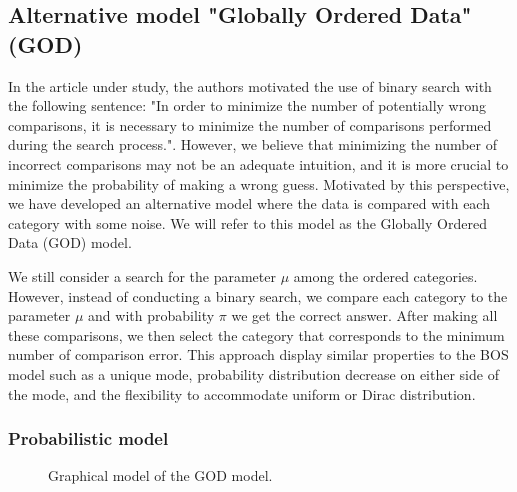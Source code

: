 \subsection{Alternative model "Globally Ordered Data" (GOD)}



In the article under study, the authors motivated the use of binary search with the following sentence: "In order to minimize the number of potentially wrong comparisons, it
is necessary to minimize the number of comparisons performed during the search process.". However, we believe that minimizing the number of incorrect comparisons may not be an adequate intuition, and it is more crucial to minimize the probability of making a wrong guess. Motivated by this perspective, we have developed an alternative model where the data is compared with each category with some noise. We will refer to this model as the Globally Ordered Data (GOD) model.

We still consider a search for the parameter $\mu$ among the ordered categories. However, instead of conducting a binary search, we compare each category to the parameter $\mu$ and with probability $\pi$ we get the correct answer. After making all these comparisons, we then select the category that corresponds to the minimum number of comparison error. This approach display similar properties to the BOS model such as a unique mode, probability distribution decrease on either side of the mode, and the flexibility to accommodate uniform or Dirac distribution.

\subsubsection{Probabilistic model}

\begin{figure}[htbp]
    \centering
    \caption{Graphical model of the GOD model.}
    \label{fig:god_graphical_model}
\end{figure}
    
